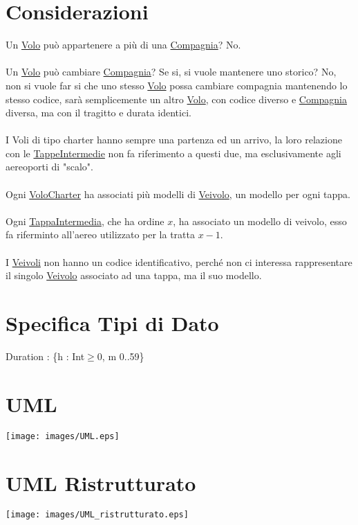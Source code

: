 \documentclass[12pt, letterpaper]{article}
\newcommand{\acc}{\\\hphantom{}\\}
\begin{document}
\section{Considerazioni}
Un \underline{Volo} può appartenere a più di una \underline{Compagnia}? No.\acc 
Un \underline{Volo} può cambiare \underline{Compagnia}? Se si, si vuole mantenere uno storico? No, non si vuole far si che uno stesso 
\underline{Volo} possa cambiare compagnia mantenendo lo stesso codice, sarà semplicemente un altro  \underline{Volo}, con codice 
diverso e \underline{Compagnia} diversa, ma con il tragitto e durata identici.\acc
I Voli di tipo charter hanno sempre una partenza ed un arrivo, la loro relazione con le \underline{TappeIntermedie} non 
fa riferimento a questi due, ma esclusivamente agli aereoporti di "scalo".
\acc 
Ogni \underline{VoloCharter} ha associati più modelli di \underline{Veivolo}, un modello per ogni tappa.
\acc 
Ogni \underline{TappaIntermedia}, che ha ordine $x$, ha associato un modello di veivolo, esso fa riferminto all'aereo utilizzato 
per la tratta $x-1$.\acc 
I \underline{Veivoli} non hanno un codice identificativo, perché non ci interessa rappresentare il singolo 
\underline{Veivolo} associato ad una tappa, ma il suo modello.
\section{Specifica Tipi di Dato}
Duration : \{h : Int\(\ge\)0, m 0..59\}
\newpage
\section{UML}
\begin{center}
    
    \texttt{[image: images/UML.eps]}
\end{center}\newpage
\section{UML Ristrutturato}
\begin{center}
    \texttt{[image: images/UML\_ristrutturato.eps]}
\end{center}
\end{document}
